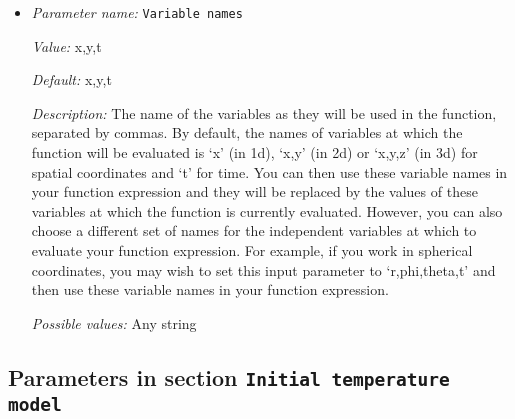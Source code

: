 \begin{itemize}
{\it Value:} 0


{\it Default:} 0


{\it Description:} The formula that denotes the function you want to evaluate for particular values of the independent variables. This expression may contain any of the usual operations such as addition or multiplication, as well as all of the common functions such as `sin' or `cos'. In addition, it may contain expressions like `if(x>0, 1, -1)' where the expression evaluates to the second argument if the first argument is true, and to the third argument otherwise. For a full overview of possible expressions accepted see the documentation of the muparser library at http://muparser.beltoforion.de/.

If the function you are describing represents a vector-valued function with multiple components, then separate the expressions for individual components by a semicolon.


{\it Possible values:} Any string
\item {\it Parameter name:} {\tt Variable names}
\label{parameters:Initial composition model/Function/Variable names}


{\it Value:} x,y,t


{\it Default:} x,y,t


{\it Description:} The name of the variables as they will be used in the function, separated by commas. By default, the names of variables at which the function will be evaluated is `x' (in 1d), `x,y' (in 2d) or `x,y,z' (in 3d) for spatial coordinates and `t' for time. You can then use these variable names in your function expression and they will be replaced by the values of these variables at which the function is currently evaluated. However, you can also choose a different set of names for the independent variables at which to evaluate your function expression. For example, if you work in spherical coordinates, you may wish to set this input parameter to `r,phi,theta,t' and then use these variable names in your function expression.


{\it Possible values:} Any string
\end{itemize}

\subsection{Parameters in section \tt Initial temperature model}
\label{parameters:Initial_20temperature_20model}

